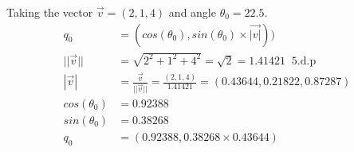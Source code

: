\documentclass{report}
\begin{document}
Taking the vector $\vec{v} = (2,1,4)$ and angle $\theta_0 = 22.5$.
\begin{align*}
q_0 &= (cos(\theta_0), sin(\theta_0) \times \vec{|v|}))\\[1em]
||\vec{v}|| &= \sqrt{2^2 + 1^ 2 + 4^2}
= \sqrt{2} 
= 1.41421 \; \; 5 \text{.d.p}\\[1em]
%
|\vec{v}| &= 
\frac{\vec{v}}{||\vec{v}||} = 
\frac{(2, 1, 4)}{1.41421 }
= (0.43644, 0.21822, 0.87287)\\[1em]
%
cos(\theta_0) &= 0.92388\\[1em]
sin(\theta_0) &= 0.38268\\[1em]
q_0 &= (0.92388,0.38268 \times 0.43644)
\end{align*}
\end{document}
